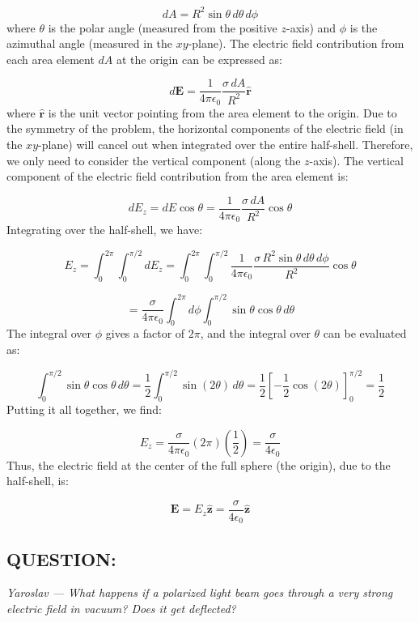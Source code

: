\documentclass[12pt]{article}
\begin{document}
\[
dA = R^2 \sin \theta \, d\theta \, d\phi
\]
\noindent
where $\theta$ is the polar angle (measured from the positive $z$-axis) and $\phi$ is the azimuthal angle (measured in the $xy$-plane). The electric field contribution from each area element $dA$ at the origin can be expressed as:

\[
d\mathbf{E} = \frac{1}{4\pi \epsilon_0} \frac{\sigma \, dA}{R^2} \hat{\mathbf{r}}
\]
\noindent
where $\hat{\mathbf{r}}$ is the unit vector pointing from the area element to the origin. Due to the symmetry of the problem, the horizontal components of the electric field (in the $xy$-plane) will cancel out when integrated over the entire half-shell. Therefore, we only need to consider the vertical component (along the $z$-axis). The vertical component of the electric field contribution from the area element is:

\[
dE_z = dE \cos \theta = \frac{1}{4\pi \epsilon_0} \frac{\sigma \, dA}{R^2} \cos \theta
\]
\noindent
Integrating over the half-shell, we have:

\[
E_z = \int_0^{2\pi} \int_0^{\pi/2} dE_z = \int_0^{2\pi} \int_0^{\pi/2} \frac{1}{4\pi \epsilon_0} \frac{\sigma \, R^2 \sin \theta \, d\theta \, d\phi}{R^2} \cos \theta
\]

\[
= \frac{\sigma}{4\pi \epsilon_0} \int_0^{2\pi} d\phi \int_0^{\pi/2} \sin \theta \cos \theta \, d\theta
\]
\noindent
The integral over $\phi$ gives a factor of $2\pi$, and the integral over $\theta$ can be evaluated as:

\[
\int_0^{\pi/2} \sin \theta \cos \theta \, d\theta = \frac{1}{2} \int_0^{\pi/2} \sin(2\theta) \, d\theta = \frac{1}{2} \left[-\frac{1}{2} \cos(2\theta)\right]_0^{\pi/2} = \frac{1}{2}
\]
\noindent
Putting it all together, we find:

\[
E_z = \frac{\sigma}{4\pi \epsilon_0} (2\pi) \left(\frac{1}{2}\right) = \frac{\sigma}{4\epsilon_0}
\]
\noindent
Thus, the electric field at the center of the full sphere (the origin), due to the half-shell, is:

\[
\mathbf{E} = E_z \hat{\mathbf{z}} = \frac{\sigma}{4\epsilon_0} \hat{\mathbf{z}}
\]

\newpage

\subsection*{QUESTION:}
\emph{Yaroslav --- What happens if a polarized light beam goes through a very strong electric field in vacuum? Does it get deflected?}
\end{document}
